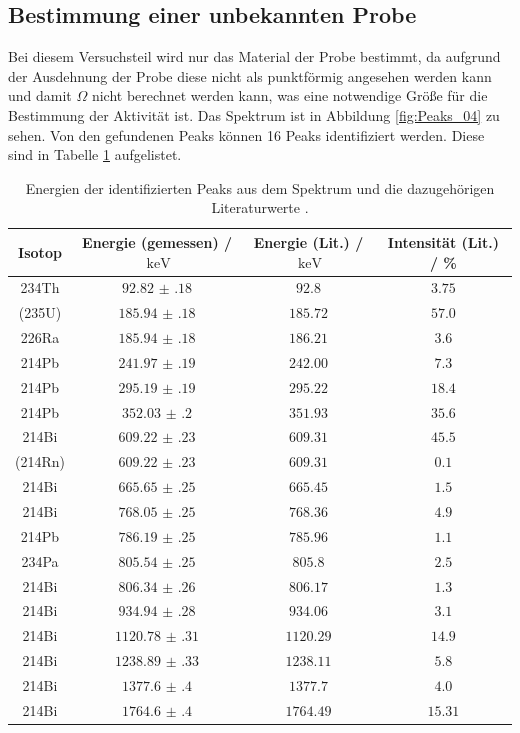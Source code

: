 \subsection{Bestimmung einer unbekannten Probe}
Bei diesem Versuchsteil wird nur  das Material der Probe bestimmt, da aufgrund der Ausdehnung der Probe diese nicht als punktförmig 
angesehen werden kann und damit $\Omega$ nicht berechnet werden kann, was eine notwendige Größe für die Bestimmung der Aktivität ist.
Das Spektrum ist in Abbildung \ref{fig:Peaks_04} zu sehen.
Von den gefundenen Peaks können 16 Peaks identifiziert werden. Diese sind in Tabelle \ref{tab:ident_Peaks} 
aufgelistet.
\FloatBarrier
\begin{table}
  \centering
  \caption{Energien der identifizierten Peaks aus dem Spektrum und die dazugehörigen Literaturwerte \cite{Gamma_lit}.}
  \label{tab:ident_Peaks}
  \begin{tabular}{c c c c}
    \midrule
    Isotop& Energie (gemessen) / $\SI{}{\kilo\eV}$&  Energie (Lit.) / $\SI{}{\kilo\eV}$& Intensität (Lit.) / \%\\
    \midrule
    234Th&$\num{92.82(18)}$&$\num{92.8}$&$\num{3.75}$\\
    (235U)&$\num{185.94(18)}$&$\num{185.72}$&$\num{57.0}$\\
    226Ra&$\num{185.94(18)}$&$\num{186.21}$&$\num{3.6}$\\
    214Pb&$\num{241.97(19)}$&$\num{242.00}$&$\num{7.3}$\\
    214Pb&$\num{295.19(19)}$&$\num{295.22}$&$\num{18.4}$\\
    214Pb&$\num{352.03(20)}$&$\num{351.93}$&$\num{35.6}$\\
    214Bi&$\num{609.22(23)}$&$\num{609.31}$&$\num{45.5}$\\
    (214Rn)&$\num{609.22(23)}$&$\num{609.31}$&$\num{0.1}$\\
    214Bi&$\num{665.65(25)}$&$\num{665.45}$&$\num{1.5}$\\
    214Bi&$\num{768.05(25)}$&$\num{768.36}$&$\num{4.9}$\\
    214Pb&$\num{786.19(25)}$&$\num{785.96}$&$\num{1.1}$\\
    234Pa&$\num{805.54(25)}$&$\num{805.8}$&$\num{2.5}$\\
    214Bi&$\num{806.34(26)}$&$\num{806.17}$&$\num{1.3}$\\
    214Bi&$\num{934.94(28)}$&$\num{934.06}$&$\num{3.1}$\\
    214Bi&$\num{1120.78(31)}$&$\num{1120.29}$&$\num{14.9}$\\
    214Bi&$\num{1238.89(33)}$&$\num{1238.11}$&$\num{5.8}$\\
    214Bi&$\num{1377.6(4)}$&$\num{1377.7}$&$\num{4.0}$\\
    214Bi&$\num{1764.6(4)}$&$\num{1764.49}$&$\num{15.31}$\\
    \bottomrule
  \end{tabular}
\end{table}
